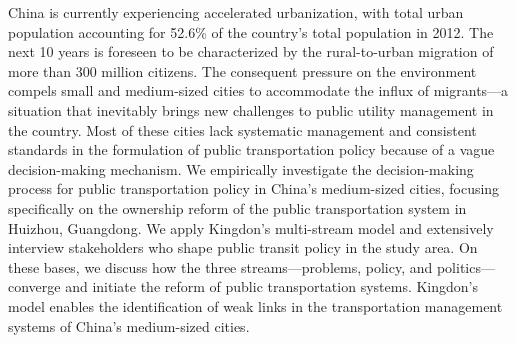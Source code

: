 China is currently experiencing accelerated urbanization, with total urban population accounting for 52.6\% of the country's total population in 2012. The next 10 years is foreseen to be characterized by the rural-to-urban migration of more than 300 million citizens. The consequent pressure on the environment compels small and medium-sized cities to accommodate the influx of migrants—a situation that inevitably brings new challenges to public utility management in the country. Most of these cities lack systematic management and consistent standards in the formulation of public transportation policy because of a vague decision-making mechanism. We empirically investigate the decision-making process for public transportation policy in China's medium-sized cities, focusing specifically on the ownership reform of the public transportation system in Huizhou, Guangdong. We apply Kingdon's multi-stream model and extensively interview stakeholders who shape public transit policy in the study area. On these bases, we discuss how the three streams—problems, policy, and politics—converge and initiate the reform of public transportation systems. Kingdon's model enables the identification of weak links in the transportation management systems of China's medium-sized cities.
